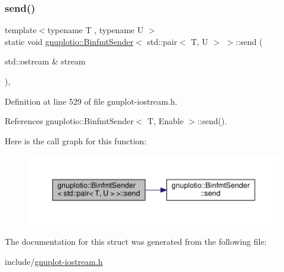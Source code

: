 \subsubsection{\texorpdfstring{send()}{send()}}
{\footnotesize\ttfamily template$<$typename T , typename U $>$ \\
static void \hyperlink{structgnuplotio_1_1_binfmt_sender}{gnuplotio\+::\+Binfmt\+Sender}$<$ std\+::pair$<$ T, U $>$ $>$\+::send (\begin{DoxyParamCaption}\item[{std\+::ostream \&}]{stream }\end{DoxyParamCaption})\hspace{0.3cm}{\ttfamily [inline]}, {\ttfamily [static]}}



Definition at line 529 of file gnuplot-\/iostream.\+h.



References gnuplotio\+::\+Binfmt\+Sender$<$ T, Enable $>$\+::send().

Here is the call graph for this function\+:\nopagebreak
\begin{figure}[H]
\begin{center}
\leavevmode
\includegraphics[width=350pt]{structgnuplotio_1_1_binfmt_sender_3_01std_1_1pair_3_01_t_00_01_u_01_4_01_4_a08b2bedbc54824cd202c664116e37243_cgraph}
\end{center}
\end{figure}


The documentation for this struct was generated from the following file\+:\begin{DoxyCompactItemize}
\item 
include/\hyperlink{gnuplot-iostream_8h}{gnuplot-\/iostream.\+h}\end{DoxyCompactItemize}
